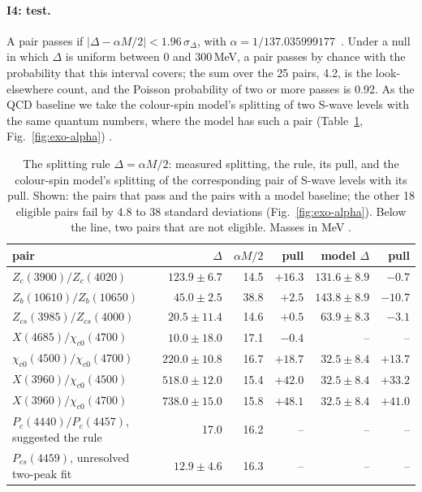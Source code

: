 \paragraph{I4: test.} A pair passes if $|\Delta-\alpha M/2|<1.96\,\sigma_\Delta$, with $\alpha=1/137.035999177$~\cite{codata2022}. Under a
null in which $\Delta$ is uniform between 0 and 300\,MeV, a pair passes by chance with the probability that this interval covers; the sum
over the 25 pairs, 4.2, is the look-elsewhere count, and the Poisson probability of two or more passes is 0.92. As the QCD baseline we
take the colour-spin model's splitting of two S-wave levels with the same quantum numbers, where the model has such a pair
(Table~\ref{tab:exo-alpha}, Fig.~\ref{fig:exo-alpha}) .

\begin{table}[tbp]\centering\footnotesize
\caption{The splitting rule $\Delta=\alpha M/2$: measured splitting, the rule, its pull, and the colour-spin model's splitting of the
corresponding pair of S-wave levels with its pull. Shown: the pairs that pass and the pairs with a model baseline; the other 18 eligible
pairs fail by 4.8 to 38 standard deviations (Fig.~\ref{fig:exo-alpha}). Below the line, two pairs that are not eligible. Masses in MeV
.}
\label{tab:exo-alpha}
\begin{tabular}{@{}lrrrrr@{}}
\toprule
pair & $\Delta$ & $\alpha M/2$ & pull & model $\Delta$ & pull \\
\midrule
$Z_c(3900)/Z_c(4020)$ & $123.9\pm6.7$ & 14.5 & $+16.3$ & $131.6\pm8.9$ & $-0.7$ \\
$Z_b(10610)/Z_b(10650)$ & $45.0\pm2.5$ & 38.8 & $+2.5$ & $143.8\pm8.9$ & $-10.7$ \\
$Z_{cs}(3985)/Z_{cs}(4000)$ & $20.5\pm11.4$ & 14.6 & $+0.5$ & $63.9\pm8.3$ & $-3.1$ \\
$X(4685)/\chi_{c0}(4700)$ & $10.0\pm18.0$ & 17.1 & $-0.4$ & -- & -- \\
$\chi_{c0}(4500)/\chi_{c0}(4700)$ & $220.0\pm10.8$ & 16.7 & $+18.7$ & $32.5\pm8.4$ & $+13.7$ \\
$X(3960)/\chi_{c0}(4500)$ & $518.0\pm12.0$ & 15.4 & $+42.0$ & $32.5\pm8.4$ & $+33.2$ \\
$X(3960)/\chi_{c0}(4700)$ & $738.0\pm15.0$ & 15.8 & $+48.1$ & $32.5\pm8.4$ & $+41.0$ \\
\midrule
$P_c(4440)/P_c(4457)$, suggested the rule & 17.0 & 16.2 & -- & -- & -- \\
$P_{cs}(4459)$, unresolved two-peak fit & $12.9\pm4.6$ & 16.3 & -- & -- & -- \\
\bottomrule
\end{tabular}
\end{table}

